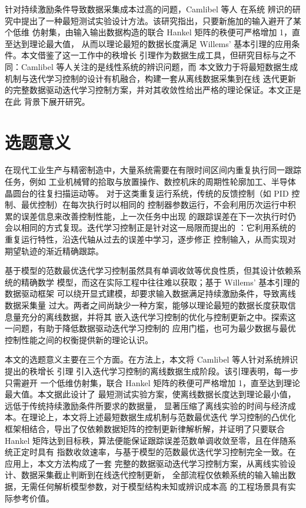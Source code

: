针对持续激励条件导致数据采集成本过高的问题，Camlibel 等人  在系统
辨识的研究中提出了一种最短测试实验设计方法。该研究指出，只要新施加的输入避开了某个低维
仿射集，由输入输出数据构造的联合 Hankel 矩阵的秩便可严格增加 1，直至达到理论最大值，
从而以理论最短的数据长度满足 Willems' 基本引理的应用条件。本文借鉴了这一工作中的秩增长
引理作为数据生成工具，但研究目标与之不同：Camlibel 等人关注的是线性系统的辨识问题，而
本文致力于将最短数据生成机制与迭代学习控制的设计有机融合，构建一套从离线数据采集到在线
迭代更新的完整数据驱动迭代学习控制方案，并对其收敛性给出严格的理论保证。本文正是在此
背景下展开研究。

\section{选题意义}

在现代工业生产与精密制造中，大量系统需要在有限时间区间内重复执行同一跟踪任务，例如
工业机械臂的拾取与放置操作、数控机床的周期性轮廓加工、半导体晶圆台的往复扫描运动等。
对于这类重复运行系统，传统的反馈控制（如 PID 控制、最优控制）在每次执行时以相同的
控制器参数运行，不会利用历次运行中积累的误差信息来改善控制性能，上一次任务中出现
的跟踪误差在下一次执行时仍会以相同的方式复现。迭代学习控制正是针对这一局限而提出的
：它利用系统的重复运行特性，沿迭代轴从过去的误差中学习，逐步修正
控制输入，从而实现对期望轨迹的渐近精确跟踪。

基于模型的范数最优迭代学习控制虽然具有单调收敛等优良性质，但其设计依赖系统的精确数学
模型，而这在实际工程中往往难以获取；基于 Willems' 基本引理的数据驱动框架
可以绕开显式建模，却要求输入数据满足持续激励条件，导致离线数据采集量
过大。两者之间尚缺少一种方案，能够以理论最短的数据长度获取信息量充分的离线数据，并将其
嵌入迭代学习控制的优化与控制更新之中。探索这一问题，有助于降低数据驱动迭代学习控制的
应用门槛，也可为最少数据与最优控制性能之间的权衡提供新的理论认识。

本文的选题意义主要在三个方面。在方法上，本文将 Camlibel 等人针对系统辨识提出的秩增长
引理 引入迭代学习控制的离线数据生成阶段。该引理表明，每一步只需避开
一个低维仿射集，联合 Hankel 矩阵的秩便可严格增加 1，直至达到理论最大值。本文据此设计了
最短测试实验方案，使离线数据长度达到理论最小值，远低于传统持续激励条件所要求的数据量，
显著压缩了离线实验的时间与经济成本。在理论上，本文将上述最短数据生成机制与范数最优迭代
学习控制的凸优化框架相结合，导出了仅依赖数据矩阵的控制更新律解析解，并证明了只要联合
Hankel 矩阵达到目标秩，算法便能保证跟踪误差范数单调收敛至零，且在伴随系统正定时具有
指数收敛速率，与基于模型的范数最优迭代学习控制完全一致。在应用上，本文方法构成了一套
完整的数据驱动迭代学习控制方案，从离线实验设计、数据采集截止判断到在线迭代控制更新，
全部流程仅依赖系统的输入输出数据，无需任何解析模型参数，对于模型结构未知或辨识成本高
的工程场景具有实际参考价值。

